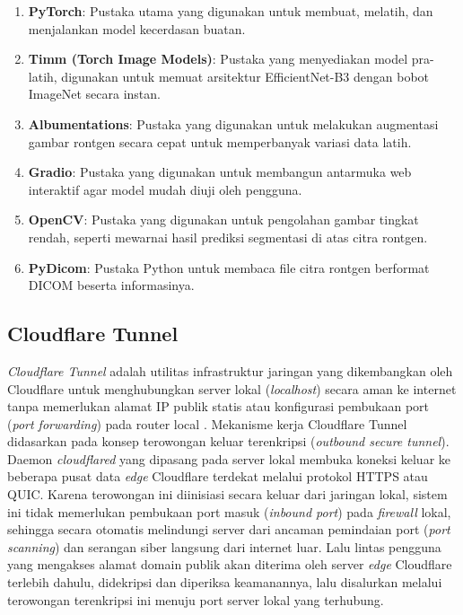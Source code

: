 \documentclass[12pt,a4paper,oneside]{book}
\begin{document}
\begin{enumerate}
  \item \textbf{PyTorch}: Pustaka utama yang digunakan untuk membuat, melatih, dan menjalankan model kecerdasan buatan.
  \item \textbf{Timm (Torch Image Models)}: Pustaka yang menyediakan model pra-latih, digunakan untuk memuat arsitektur EfficientNet-B3 dengan bobot ImageNet secara instan.
  \item \textbf{Albumentations}: Pustaka yang digunakan untuk melakukan augmentasi gambar rontgen secara cepat untuk memperbanyak variasi data latih.
  \item \textbf{Gradio}: Pustaka yang digunakan untuk membangun antarmuka web interaktif agar model mudah diuji oleh pengguna.
  \item \textbf{OpenCV}: Pustaka yang digunakan untuk pengolahan gambar tingkat rendah, seperti mewarnai hasil prediksi segmentasi di atas citra rontgen.
  \item \textbf{PyDicom}: Pustaka Python untuk membaca file citra rontgen berformat DICOM beserta informasinya.
\end{enumerate}

\subsection{Cloudflare Tunnel}

\textit{Cloudflare Tunnel} adalah utilitas infrastruktur jaringan yang dikembangkan oleh Cloudflare untuk menghubungkan server lokal (\textit{localhost}) secara aman ke internet tanpa memerlukan alamat IP publik statis atau konfigurasi pembukaan port (\textit{port forwarding}) pada router local \parencite{cloudflare2024}. Mekanisme kerja Cloudflare Tunnel didasarkan pada konsep terowongan keluar terenkripsi (\textit{outbound secure tunnel}). Daemon \textit{cloudflared} yang dipasang pada server lokal membuka koneksi keluar ke beberapa pusat data \textit{edge} Cloudflare terdekat melalui protokol HTTPS atau QUIC. Karena terowongan ini diinisiasi secara keluar dari jaringan lokal, sistem ini tidak memerlukan pembukaan port masuk (\textit{inbound port}) pada \textit{firewall} lokal, sehingga secara otomatis melindungi server dari ancaman pemindaian port (\textit{port scanning}) dan serangan siber langsung dari internet luar. Lalu lintas pengguna yang mengakses alamat domain publik akan diterima oleh server \textit{edge} Cloudflare terlebih dahulu, didekripsi dan diperiksa keamanannya, lalu disalurkan melalui terowongan terenkripsi ini menuju port server lokal yang terhubung.
\end{document}
